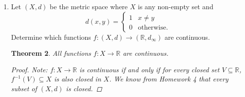\documentclass{amsart}
\newtheorem{theorem}{Theorem}
\begin{document}
\begin{enumerate}[1.]
\begin{theorem}
\begin{proof}
        Note: from Lemma 20 we see that $4$ is a limit point of $E$. \\
        Fix $\epsilon > 0$, and choose $\delta > 0$ such that $\delta < \min\{\epsilon, 1\}$.
        Suppose 
        \[
            0 < |x - 4| < \delta    
        \]
        Then we see that 
        \begin{align*}
            |(x + 2) - 6| &< \delta \\
            \left| \frac{(x - 1)\cdot(x + 2)}{(x - 1)} - 6\right| &< \delta
        \end{align*}
        Note: $x - 1 \neq 0$ because 
        \begin{align*}
            |1 - 4| &\leq |x - 1| + |x - 4| \\
            3 &< |x - 1| + 1 \\
            |x - 1| &> 2
        \end{align*}
        Note: $x - 3 \neq 0$ because 
        \begin{align*}
            |3 - 4| &\leq |x - 3| + |x - 4| \\
            1 &< |x - 3| + 1 \\
            |x - 3| &> 0
        \end{align*}
        Finally we see that 
        \begin{align*}
            \left| \frac{x^3-2x^2-5x+6}{x^2-4x+3} - 6 \right| &< \delta \\
            | f(x) - 6 | &< \delta < \epsilon.
        \end{align*}
        Thus, $\displaystyle \lim_{x \to 1} f(x) = 6$.
    \end{proof}
\end{theorem}
\newpage
\item  Let $(X,d)$ be the metric space where $X$ is any non-empty set and
\[ d(x,y) = \begin{cases} 1 & x\neq y \\ 
                          0 & \text{otherwise.}
                          \end{cases}\]
Determine which functions $f: (X,d) \rightarrow (\mathbb{R},d_{\infty})$ are continuous. 
\begin{theorem}
    All functions $f: X \to \mathbb{R}$ are continuous.
    \begin{proof}
        Note: $f: X \to \mathbb{R}$ is continuous if and only if for every closed set $V \subseteq \mathbb{R}$, $f^{-1}(V) \subseteq X$ is also closed in $X$.
        We know from Homework 4 that every subset of $(X,d)$ is closed.

\end{proof}
\end{theorem}
\end{enumerate}
\end{document}
